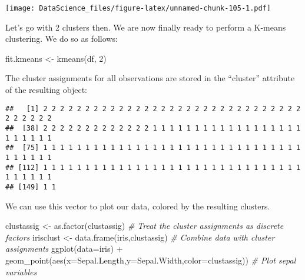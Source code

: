 \documentclass[
]{book}
\newenvironment{Shaded}{\begin{snugshade}}{\end{snugshade}}
\newcommand{\AttributeTok}[1]{\textcolor[rgb]{0.77,0.63,0.00}{#1}}
\newcommand{\CommentTok}[1]{\textcolor[rgb]{0.56,0.35,0.01}{\textit{#1}}}
\newcommand{\DecValTok}[1]{\textcolor[rgb]{0.00,0.00,0.81}{#1}}
\newcommand{\FunctionTok}[1]{\textcolor[rgb]{0.00,0.00,0.00}{#1}}
\newcommand{\NormalTok}[1]{#1}
\newcommand{\OtherTok}[1]{\textcolor[rgb]{0.56,0.35,0.01}{#1}}
\newcommand{\SpecialCharTok}[1]{\textcolor[rgb]{0.00,0.00,0.00}{#1}}
\begin{document}
\texttt{[image: DataScience\_files/figure-latex/unnamed-chunk-105-1.pdf]}

Let's go with 2 clusters then. We are now finally ready to perform a K-means clustering. We do so as follows:

\begin{Shaded}
\begin{Highlighting}[]
\NormalTok{fit.kmeans }\OtherTok{\textless{}{-}} \FunctionTok{kmeans}\NormalTok{(df, }\DecValTok{2}\NormalTok{)}
\end{Highlighting}
\end{Shaded}

The cluster assignments for all observations are stored in the ``cluster'' attribute of the resulting object:

\begin{Shaded}
\end{Shaded}

\begin{verbatim}
##   [1] 2 2 2 2 2 2 2 2 2 2 2 2 2 2 2 2 2 2 2 2 2 2 2 2 2 2 2 2 2 2 2 2 2 2 2 2 2
##  [38] 2 2 2 2 2 2 2 2 2 2 2 2 2 1 1 1 1 1 1 1 1 1 1 1 1 1 1 1 1 1 1 1 1 1 1 1 1
##  [75] 1 1 1 1 1 1 1 1 1 1 1 1 1 1 1 1 1 1 1 1 1 1 1 1 1 1 1 1 1 1 1 1 1 1 1 1 1
## [112] 1 1 1 1 1 1 1 1 1 1 1 1 1 1 1 1 1 1 1 1 1 1 1 1 1 1 1 1 1 1 1 1 1 1 1 1 1
## [149] 1 1
\end{verbatim}

We can use this vector to plot our data, colored by the resulting clusters.

\begin{Shaded}
\begin{Highlighting}[]
\NormalTok{clustassig }\OtherTok{\textless{}{-}} \FunctionTok{as.factor}\NormalTok{(clustassig) }\CommentTok{\# Treat the cluster assignments as discrete factors}
\NormalTok{irisclust }\OtherTok{\textless{}{-}} \FunctionTok{data.frame}\NormalTok{(iris,clustassig) }\CommentTok{\# Combine data with cluster assignments}
\FunctionTok{ggplot}\NormalTok{(}\AttributeTok{data=}\NormalTok{iris) }\SpecialCharTok{+} \FunctionTok{geom\_point}\NormalTok{(}\FunctionTok{aes}\NormalTok{(}\AttributeTok{x=}\NormalTok{Sepal.Length,}\AttributeTok{y=}\NormalTok{Sepal.Width,}\AttributeTok{color=}\NormalTok{clustassig)) }\CommentTok{\# Plot sepal variables}
\end{Highlighting}
\end{Shaded}
\end{document}
